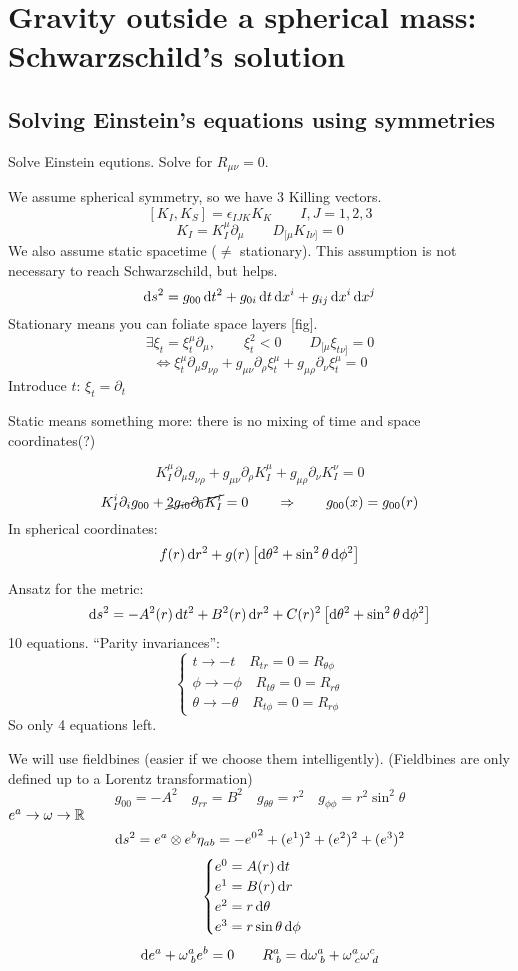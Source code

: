\chapter{Gravity outside a spherical mass: Schwarzschild's solution}
\section{Solving Einstein's equations using symmetries}
Solve Einstein equtions. Solve for $R_{\mu\nu} = 0$.

We assume spherical symmetry, so we have 3 Killing vectors.
\[ [K_I, K_S] = \epsilon_{IJK}K_K \qquad I,J = 1,2,3 \]
\[ K_I = K_I^\mu\partial_\mu \qquad D_{[\mu}K_{I\nu]} = 0  \]
We also assume static spacetime ($\neq$ stationary). This assumption is not necessary to reach Schwarzschild, but helps.
\[ \operatorname{d \!}{s}^2 = g_{00}\operatorname{d \!}{t}^2 + g_{0i}\operatorname{d \!}{t}\operatorname{d \!}{x}^i + g_{ij}\operatorname{d \!}{x}^i \operatorname{d \!}{x}^j \]
Stationary means you can foliate space layers [fig].
\[ \exists \xi_t = \xi_t^\mu\partial_\mu, \qquad \xi_t^2 < 0 \qquad D_{[\mu}\xi_{t\nu]} = 0 \]
\[ \Leftrightarrow \xi_t^\mu\partial_\mu g_{\nu\rho} + g_{\mu\nu}\partial_\rho\xi^\mu_t + g_{\mu\rho}\partial_\nu\xi_t^\mu = 0 \]
Introduce $t$: $\xi_t = \partial_t$

Static means something more: there is no mixing of time and space coordinates(?)

\[ K_I^\mu\partial_\mu g_{\nu\rho} + g_{\mu\nu}\partial_\rho K_I^\mu + g_{\mu\rho}\partial_\nu K_I^\nu = 0 \]
\[ K_I^i\partial_i g_{00} + \cancel{2g_{i0}\partial_0K_I^i} = 0 \qquad \Rightarrow \qquad g_{00}(x) = g_{00}(r) \]
In spherical coordinates:
\[ f(r)\operatorname{d \!}{r}^2 + g(r) \left[\operatorname{d \!}{\theta}^2 + \sin^2\theta \operatorname{d \!}{\phi}^2\right] \]

Ansatz for the metric:
\[ \operatorname{d \!}{s}^2 = -A^2(r)\operatorname{d \!}{t}^2 + B^2(r)\operatorname{d \!}{r}^2 + C(r)^2 \left[\operatorname{d \!}{\theta}^2 + \sin^2\theta \operatorname{d \!}{\phi}^2\right] \]
10 equations.
``Parity invariances'':
\[ \begin{cases}
t \to -t \quad R_{tr} = 0 = R_{\theta\phi} \\
\phi \to -\phi \quad R_{t\theta} = 0 = R_{r\theta} \\
\theta \to -\theta \quad R_{t\phi} = 0 = R_{r\phi}
\end{cases} \]
So only 4 equations left.

We will use fieldbines (easier if we choose them intelligently). (Fieldbines are only defined up to a Lorentz transformation)
\[ g_{00} = -A^2 \quad g_{rr} = B^2 \quad g_{\theta\theta} = r^2 \quad g_{\phi\phi} = r^2\sin^2\theta \]
$e^a \to \omega \to \mathbb{R}$
\[ \operatorname{d \!}{s}^2 = e^a\otimes e^b \eta_{ab} = -{e^0}^2 + (e^1)^2 + (e^2)^2 + (e^3)^2 \]
\[ \begin{cases}
e^0 = A(r)\operatorname{d \!}{t} \\
e^1 = B(r)\operatorname{d \!}{r} \\
e^2 = r \operatorname{d \!}{\theta} \\
e^3 = r\sin\theta \operatorname{d \!}{\phi}
\end{cases} \]
\[\operatorname{d \!}{e^a}+\omega^a_{\;b}e^b = 0 \qquad R^a_{\;b} = \operatorname{d \!}{\omega}^a_{\;b}+ \omega^a_{\;c}\omega^c_{\;d}\]

